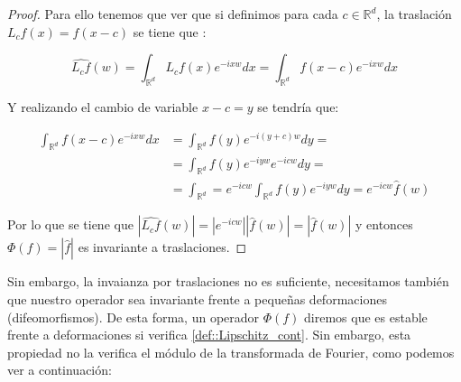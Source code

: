 \begin{proof}
    \noindent Para ello tenemos que ver que si definimos para cada $c \in \mathbb{R}^d$, la traslación $L_cf(x)=f(x-c)$ se tiene que :  
    
    $$\widehat{L_cf}(w)=\int_{\mathbb{R}^d}{L_cf(x) e^{-ixw} dx}=\int_{\mathbb{R}^d}{f(x-c)e^{-ixw}dx}$$
    
    \noindent Y realizando el cambio de variable $x-c=y$ se tendría que: 
    
    \begin{align*}
        \int_{\mathbb{R}^d}{f(x-c)e^{-ixw}dx} &= \int_{\mathbb{R}^d}{f(y)e^{-i(y+c)w}dy}= \\      &=\int_{\mathbb{R}^d}{f(y)e^{-iyw}e^{-icw}dy}= \\ &=\int_{\mathbb{R}^d}=e^{-icw}\int_{\mathbb{R}^d}{f(y)e^{-iyw}dy}=e^{-icw}\widehat{f}(w)
    \end{align*}
    
    \noindent Por lo que se tiene que $|\widehat{L_cf}(w)|=|e^{-icw}| |\widehat{f}(w)|=|\widehat{f}(w)|$ y entonces $\Phi(f)=|\widehat{f}|$ es invariante a traslaciones. \qedhere
\end{proof}

\medskip
    
\noindent Sin embargo, la invaianza por traslaciones no es suficiente, necesitamos también que nuestro operador sea invariante frente a pequeñas deformaciones (difeomorfismos). De esta forma, un operador $\Phi(f)$ diremos que es estable frente a deformaciones si verifica \autoref{def::Lipschitz_cont}. Sin embargo, esta propiedad no la verifica el módulo de la transformada de Fourier, como podemos ver a continuación:

